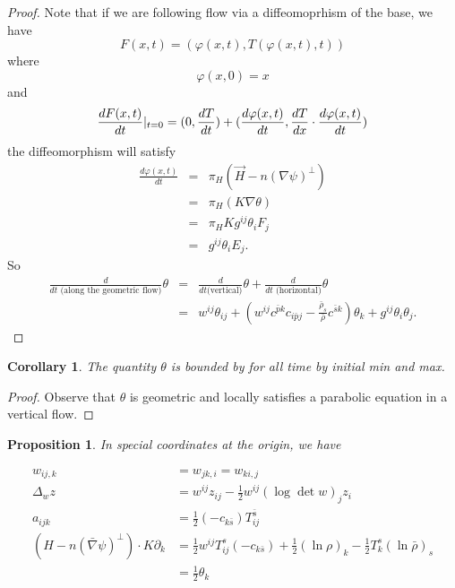 \documentclass[12pt,letterpaper]{amsart}%
\newcounter{mycounter}
\numberwithin{mycounter}{section}
\theoremstyle{plain}
\newtheorem{corollary}[mycounter]{Corollary}
\newtheorem{proposition}[mycounter]{Proposition}
\numberwithin{equation}{section}
\theoremstyle{definition}
\begin{document}
\begin{proof}
Note that if we are following flow via a diffeomoprhism of the base, we have 
\begin{equation*}
F(x,t)=\left( \varphi (x,t),T\left( \varphi (x,t),t\right) \right) 
\end{equation*}%
where 
\begin{equation*}
\varphi (x,0)=x
\end{equation*}%
and 
\begin{equation*}
\frac{dF(x,t)}{dt}|_{t=0}=(0,\frac{dT}{dt})+(\frac{d\varphi (x,t)}{dt},\frac{%
dT}{dx}\cdot \frac{d\varphi (x,t)}{dt})
\end{equation*}%
the diffeomorphism will satisfy 
\begin{eqnarray*}
\frac{d\varphi (x,t)}{dt} &=&\pi _{H}(\vec{H}-n\left( \nabla \psi \right)
^{\perp }) \\
&=&\pi _{H}(K\nabla \theta ) \\
&=&\pi _{H}Kg^{ij}\theta _{i}F_{j} \\
&=&g^{ij}\theta _{i}E_{j}.
\end{eqnarray*}%
So 
\begin{eqnarray*}
\frac{d}{dt\text{\ (along the geometric flow)}}\theta  &=&\frac{d}{dt\text{
(vertical)}}\theta +\frac{d}{dt\text{ (horizontal)}}\theta  \\
&=&w^{ij}\theta _{ij}+\left( w^{ij}c^{\bar{p}k}c_{i\bar{p}j}-\frac{\bar{\rho}%
_{s}}{\bar{\rho}}c^{\bar{s}k}\right) \theta _{k}+g^{ij}\theta _{i}\theta
_{j}.
\end{eqnarray*}
\end{proof}


\begin{corollary}
    The quantity $\theta$ is bounded by for all time by initial min and max.  
\end{corollary}

\begin{proof}
    Observe that $\theta$ is geometric and locally satisfies a parabolic equation in a vertical flow.  
\end{proof}





\begin{proposition}
In special coordinates at the origin, we have

\begin{align*}
w_{ij,k}  & =w_{jk,i}=w_{ki,j}\\
\Delta_{w}z  & =w^{ij}z_{ij}-\frac{1}{2}w^{ij}\left(  \log\det w\right)
_{j}z_{i}\\
a_{ijk}  & =\frac{1}{2}(-c_{k\bar{s}})T_{ij}^{\bar{s}}\\
\left(  H-n\left(  \bar{\nabla}\psi\right)  ^{\perp}\right)  \cdot
K\partial_{k}  & =\frac{1}{2}w^{ij}T_{ij}^{s}(-c_{k\bar{s}})+\frac{1}%
{2}\left(  \ln\rho\right)  _{k}-\frac{1}{2}T_{k}^{s}\left(  \ln\bar{\rho
}\right)  _{s}\\
& =\frac{1}{2}\theta_{k}%
\end{align*}
\end{proposition}
\end{document}
